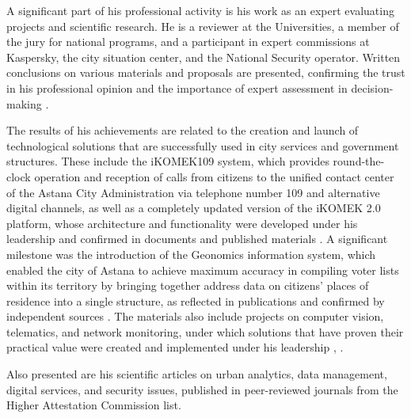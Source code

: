 A significant part of his professional activity is his work as an expert evaluating projects and scientific research. He is a reviewer at the Universities, a member of the jury for national programs, and a participant in expert commissions at Kaspersky, the city situation center, and the National Security operator. Written conclusions on various materials and proposals are presented, confirming the trust in his professional opinion and the importance of expert assessment in decision-making .

The results of his achievements are related to the creation and launch of technological solutions that are successfully used in city services and government structures. These include the iKOMEK109 system, which provides round-the-clock operation and reception of calls from citizens to the unified contact center of the Astana City Administration via telephone number 109 and alternative digital channels, as well as a completely updated version of the iKOMEK 2.0 platform, whose architecture and functionality were developed under his leadership and confirmed in documents and published materials   . A significant milestone was the introduction of the Geonomics information system, which enabled the city of Astana to achieve maximum accuracy in compiling voter lists within its territory by bringing together address data on citizens' places of residence into a single structure, as reflected in publications and confirmed by independent sources . The materials also include projects on computer vision, telematics, and network monitoring, under which solutions that have proven their practical value were created and implemented under his leadership , .

Also presented are his scientific articles on urban analytics, data management, digital services, and security issues, published in peer-reviewed journals from the Higher Attestation Commission list.
